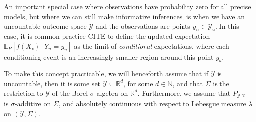 \documentclass[twoside,11pt]{article}
\newcommand{\nats}{\mathbb{N}}
\newcommand{\reals}{\mathbb{R}}
\newcommand{\states}{\mathcal{X}}
\newcommand{\observs}{\mathcal{Y}}
\begin{document}
An important special case where observations have probability zero for all precise models, but where we can still make informative inferences, is when we have an uncountable outcome space $\observs$ and the observations are points $y_u\in\observs_u$. In this case, it is common practice CITE to define the updated expectation $\mathbb{E}_P[f(X_v)\,\vert\,Y_u=y_u]$ as the limit of \emph{conditional} expectations, where each conditioning event is an increasingly smaller region around this point $y_u$.

To make this concept practicable, we will henceforth assume that if $\observs$ is uncountable, then it is some set $\observs\subseteq\reals^d$, for some $d\in\nats$, and that $\Sigma$ is the restriction to $\observs$ of the Borel $\sigma$-algebra on $\reals^d$. Furthermore, we assume that $P_{\observs\vert\states}$ is $\sigma$-additive on $\Sigma$, and absolutely continuous with respect to Lebesgue measure $\lambda$ on $(\observs,\Sigma)$.
\end{document}
